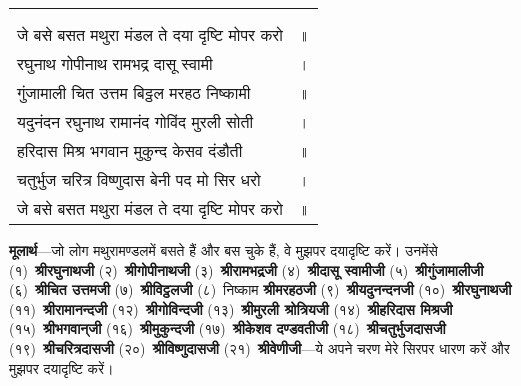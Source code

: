 
{
{\bfseries
\setlength{\mylenone}{0pt}
\settowidth{\mylentwo}{}
\setlength{\mylenone}{\maxof{\mylenone}{\mylentwo}}
\settowidth{\mylentwo}{जे बसे बसत मथुरा मंडल ते दया दृष्टि मोपर करो}
\setlength{\mylenone}{\maxof{\mylenone}{\mylentwo}}
\settowidth{\mylentwo}{रघुनाथ गोपीनाथ रामभद्र दासू स्वामी}
\setlength{\mylenone}{\maxof{\mylenone}{\mylentwo}}
\settowidth{\mylentwo}{गुंजामाली चित उत्तम बिट्ठल मरहठ निष्कामी}
\setlength{\mylenone}{\maxof{\mylenone}{\mylentwo}}
\settowidth{\mylentwo}{यदुनंदन रघुनाथ रामानंद गोविंद मुरली सोती}
\setlength{\mylenone}{\maxof{\mylenone}{\mylentwo}}
\settowidth{\mylentwo}{हरिदास मिश्र भगवान मुकुन्द केसव दंडौती}
\setlength{\mylenone}{\maxof{\mylenone}{\mylentwo}}
\settowidth{\mylentwo}{चतुर्भुज चरित्र विष्णुदास बेनी पद मो सिर धरो}
\setlength{\mylenone}{\maxof{\mylenone}{\mylentwo}}
\settowidth{\mylentwo}{जे बसे बसत मथुरा मंडल ते दया दृष्टि मोपर करो}
\setlength{\mylenone}{\maxof{\mylenone}{\mylentwo}}
\setlength{\mylentwo}{\baselineskip}
\setlength{\mylenone}{\mylenone + 1pt}
\begin{longtable}[l]{@{\hspace*{\mylen}}>{\setlength\parfillskip{0pt}}p{\mylenone}@{}@{}l@{}}
 & \\[-\the\mylentwo]
\centering{॥ १०३ \hspace*{-1.5mm}॥} & \\ \nopagebreak
जे बसे बसत मथुरा मंडल ते दया दृष्टि मोपर करो & ॥\\
रघुनाथ गोपीनाथ रामभद्र दासू स्वामी & ।\\ \nopagebreak
गुंजामाली चित उत्तम बिट्ठल मरहठ निष्कामी & ॥\\
यदुनंदन रघुनाथ रामानंद गोविंद मुरली सोती & ।\\ \nopagebreak
हरिदास मिश्र भगवान मुकुन्द केसव दंडौती & ॥\\
चतुर्भुज चरित्र विष्णुदास बेनी पद मो सिर धरो & ।\\ \nopagebreak
जे बसे बसत मथुरा मंडल ते दया दृष्टि मोपर करो & ॥
\end{longtable}
}
}
\begin{sloppypar}\justifying{}
\textbf{मूलार्थ}—जो लोग मथुरा\-मण्डलमें बसते हैं और बस चुके हैं, वे मुझपर दयादृष्टि करें। उनमेंसे (१)~\textbf{श्रीरघुनाथजी} (२)~\textbf{श्रीगोपीनाथजी} (३)~\textbf{श्रीरामभद्रजी} (४)~\textbf{श्रीदासू स्वामीजी} (५)~\textbf{श्रीगुंजामालीजी} (६)~\textbf{श्रीचित उत्तमजी} (७)~\textbf{श्रीविट्ठलजी} (८)~निष्काम \textbf{श्रीमरहठजी} (९)~\textbf{श्रीयदुनन्दनजी} (१०)~\textbf{श्रीरघुनाथजी} (११)~\textbf{श्रीरामानन्दजी} (१२)~\textbf{श्रीगोविन्दजी} (१३)~\textbf{श्रीमुरली श्रोत्रियजी} (१४)~\textbf{श्रीहरिदास मिश्रजी} (१५)~\textbf{श्रीभगवान्‌जी} (१६)~\textbf{श्रीमुकुन्दजी} (१७)~\textbf{श्रीकेशव दण्डवतीजी} (१८)~\textbf{श्रीचतुर्भुज\-दासजी} (१९)~\textbf{श्रीचरित्र\-दासजी} (२०)~\textbf{श्रीविष्णुदासजी} (२१)~\textbf{श्रीवेणीजी}—ये अपने चरण मेरे सिरपर धारण करें और मुझपर दयादृष्टि करें।
\end{sloppypar}

